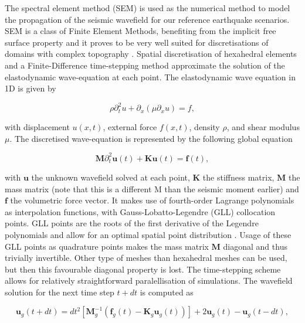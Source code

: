 \documentclass[../Text/00main.tex]{subfiles}
\begin{document}
The spectral element method (SEM) is used as the numerical method to model the propagation of the seismic wavefield for our reference earthquake scenarios. SEM is a class of Finite Element Methods, benefiting from the implicit free surface property and it proves to be very well suited for discretisations of domains with complex topography \citep{fichtner_deep_2013}. Spatial discretisation of hexahedral elements and a Finite-Difference time-stepping method approximate the solution of the elastodynamic wave-equation at each point. The elastodynamic wave equation in 1D is given by

\begin{equation}
\rho \partial_{t}^{2} u + \partial_{x}\left(\mu \partial_{x} u\right) = f,
\label{eq:elastodynamic1D}
\end{equation}

with displacement $u(x,t)$, external force $f(x,t)$, density $\rho$, and shear modulus $\mu$. The discretised wave-equation is represented by the following global equation

\begin{equation}
    \mathbf{M}\partial^2_t\mathbf{u}(t) +
    \mathbf{Ku}(t) =
    \mathbf{f}(t),
    \label{eq:mutkutglobal}
\end{equation}

with $\mathbf{u}$ the unknown wavefield solved at each point, $\mathbf{K}$ the stiffness matrix, $\mathbf{M}$ the mass matrix (note that this is a different M than the seismic moment earlier) and $\mathbf{f}$ the volumetric force vector. It makes use of fourth-order Lagrange polynomials as interpolation functions, with Gauss-Lobatto-Legendre (GLL) collocation points. GLL points are the roots  of the first derivative of the Legendre polynomials and allow for an optimal spatial point distribution \citep{igel_spectral-element_2016}. Usage of these GLL points as quadrature points makes the mass matrix $\mathbf{M}$ diagonal and thus trivially invertible. Other type of meshes than hexahedral meshes can be used, but then this favourable diagonal property is lost. The time-stepping scheme allows for relatively straightforward paralellisation of simulations. The wavefield solution for the next time step $t + dt$ is computed as

\begin{equation}
\mathbf{u}_{g}(t+d t)= dt^{2}\left[\mathbf{M}_{g}^{-1}\left(\mathbf{f}_{g}(t)
-\mathbf{K}_{g} \mathbf{u}_{g}(t)\right)\right] 
+ 2 \mathbf{u}_{g}(t)-\mathbf{u}_{g}(t-d t) ,
\end{equation} 
\end{document}
